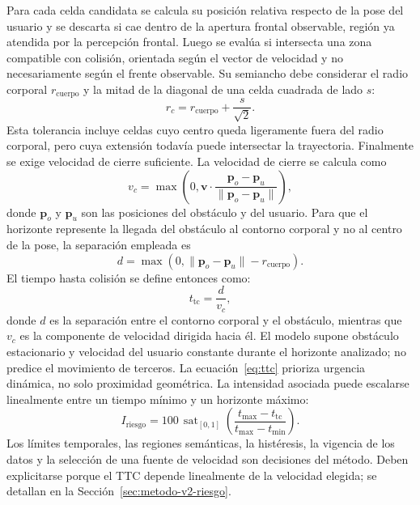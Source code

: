 Para cada celda candidata se calcula su posición relativa respecto de la pose del usuario y se
descarta si cae dentro de la apertura frontal observable, región ya atendida
por la percepción frontal. Luego se evalúa si intersecta una zona compatible con colisión,
orientada según el vector de velocidad y no necesariamente según el frente observable. Su
semiancho debe considerar el radio corporal $r_{\mathrm{cuerpo}}$ y la mitad de la diagonal de
una celda cuadrada de lado $s$:
\begin{equation}
  r_c=r_{\mathrm{cuerpo}}+\frac{s}{\sqrt{2}}.
  \label{eq:collision-corridor-radius}
\end{equation}
Esta tolerancia incluye celdas cuyo centro queda ligeramente fuera del radio corporal, pero
cuya extensión todavía puede intersectar la trayectoria. Finalmente se exige velocidad de cierre
suficiente. La velocidad de cierre se calcula como
\begin{equation}
  v_c=\max\left(0,\mathbf v\cdot
  \frac{\mathbf p_o-\mathbf p_u}{\lVert\mathbf p_o-\mathbf p_u\rVert}\right),
  \label{eq:closing-speed}
\end{equation}
donde $\mathbf p_o$ y $\mathbf p_u$ son las posiciones del obstáculo y del usuario. Para que el
horizonte represente la llegada del obstáculo al contorno corporal y no al centro de la pose, la
separación empleada es
\begin{equation}
  d=\max\left(0,\lVert\mathbf p_o-\mathbf p_u\rVert-r_{\text{cuerpo}}\right).
  \label{eq:body-clearance}
\end{equation}
El tiempo hasta colisión se define entonces como:
\begin{equation}
  t_{\text{tc}} = \frac{d}{v_c},
  \label{eq:ttc}
\end{equation}
donde $d$ es la separación entre el contorno corporal y el obstáculo, mientras que $v_c$ es la
componente de velocidad dirigida hacia él.
El modelo supone obstáculo estacionario y velocidad del usuario constante durante el horizonte
analizado; no predice el movimiento de terceros.
La ecuación~\ref{eq:ttc} prioriza urgencia dinámica, no solo proximidad geométrica. La
intensidad asociada puede escalarse linealmente entre un tiempo mínimo y un horizonte máximo:
\begin{equation}
  I_{\text{riesgo}} =
  100\,
  \operatorname{sat}_{[0,1]}
  \left(
    \frac{t_{\max}-t_{\text{tc}}}{t_{\max}-t_{\min}}
  \right).
  \label{eq:risk-intensity}
\end{equation}
Los límites temporales, las regiones semánticas, la histéresis, la vigencia de los datos y la
selección de una fuente de velocidad son decisiones del método. Deben explicitarse porque el TTC
depende linealmente de la velocidad elegida; se detallan en la
Sección~\ref{sec:metodo-v2-riesgo}.

